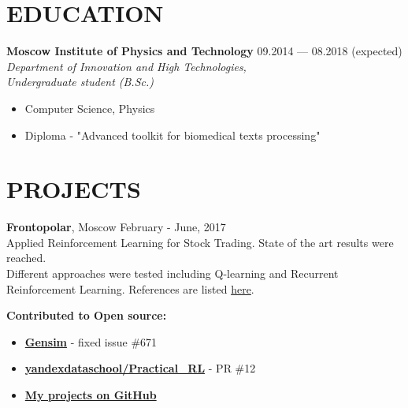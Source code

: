 \documentclass[margin, 9pt]{res} %
\begin{document}
\begin{resume}

\section{EDUCATION}
\textbf{Moscow Institute of Physics and Technology} \hfill 09.2014 --- 08.2018 (expected) \\
{\sl Department of Innovation and High Technologies, \\
Undergraduate student (B.Sc.)}
\begin{itemize}
\item Computer Science, Physics
\item Diploma - "Advanced toolkit for biomedical texts processing"
\end{itemize}


\section{PROJECTS}

\textbf{Frontopolar}, Moscow  \hfill February - June, 2017 \\
Applied Reinforcement Learning for Stock Trading. State of the art results were reached.
\\Different approaches were tested including Q-learning and Recurrent Reinforcement Learning. References are listed \href{https://github.com/FRTP/Algorithms/wiki}{here}.

\textbf{Contributed to Open source:}
\begin{itemize}
	\item \href{https://github.com/RaRe-Technologies/gensim}{\textbf{Gensim}} - fixed issue \#671
	\item \href{https://github.com/yandexdataschool/Practical_RL}{\textbf{yandexdataschool/Practical\_RL}} - PR \#12
	\item \href{https://github.com/akarazeevprojects}{\textbf{My projects on GitHub}}
\end{itemize}



\end{resume}
\end{document}
